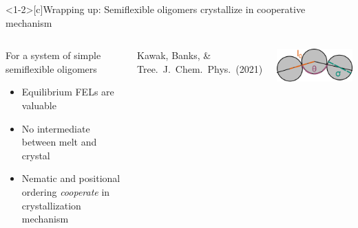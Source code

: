 \documentclass[aspectratio=169]{beamer}
\begin{document}
\begin{frame}<1-2>[c]{Wrapping up: Semiflexible oligomers crystallize in cooperative mechanism}

  \vspace{-1\baselineskip}
  \begin{columns}[T, onlytextwidth]


    \centering
    \vspace{0.5\baselineskip}
    \begin{block}{For a system of simple semiflexible oligomers}
      \begin{itemize}
      \item Equilibrium FELs are valuable 
      \item No intermediate between melt and crystal
      \item Nematic and positional ordering \emph{cooperate} in crystallization mechanism
    \end{itemize}
    \end{block}

    {\small{}Kawak, Banks, \& Tree.~J.~Chem.~Phys.~(2021)\par}
  \vspace{0.6\baselineskip}


  \vspace{0.8\baselineskip}
    \centering
    \includegraphics[]{figs/fig-stiff_PE_single.pdf}


\end{columns}
\end{frame}
\end{document}
